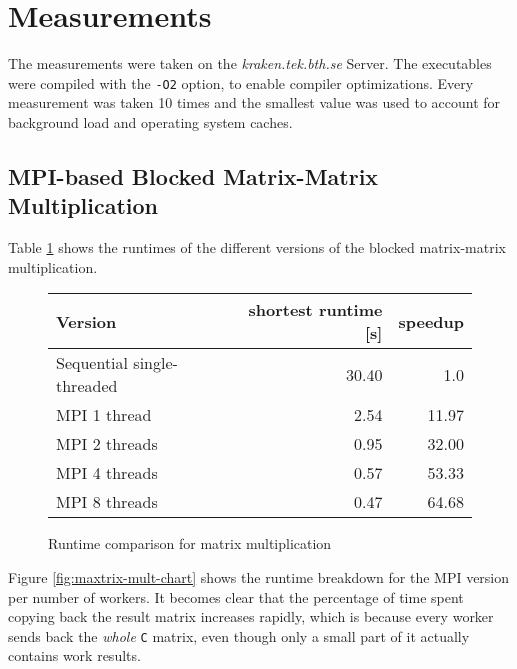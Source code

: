 \documentclass[]{article}
\begin{document}
\section{Measurements}

The measurements were taken on the \emph{kraken.tek.bth.se} Server. The executables were compiled with the \texttt{-O2} option, to enable compiler optimizations. Every measurement was taken 10 times and the smallest value was used to account for background load and operating system caches.

\subsection{MPI-based Blocked Matrix-Matrix Multiplication}

 Table \ref{tab:matrix-mult-runtime} shows the runtimes of the different versions of the blocked matrix-matrix multiplication.

\begin{figure}[h]
	\centering
	\begin{tabular}{|l|r|r|}
		\hline
		\textbf{Version} & \textbf{shortest runtime [s]} & \textbf{speedup} \\
		\hline
		Sequential single-threaded	& 30.40	& 1.0 \\ 
		\hline 
		MPI 1 thread				& 2.54	& 11.97 \\ 
		\hline 
		MPI 2 threads				& 0.95	& 32.00 \\ 
		\hline 
		MPI 4 threads				& 0.57	& 53.33 \\ 
		\hline 
		MPI 8 threads				& 0.47	& 64.68 \\ 
		\hline 
	\end{tabular} 
	\caption{Runtime comparison for matrix multiplication}
	\label{tab:matrix-mult-runtime}
\end{figure}

Figure \ref{fig:maxtrix-mult-chart} shows the runtime breakdown for the MPI version per number of workers. It becomes clear that the percentage of time spent copying back the result matrix increases rapidly, which is because every worker sends back the \emph{whole} \texttt{C} matrix, even though only a small part of it actually contains work results.
\end{document}

